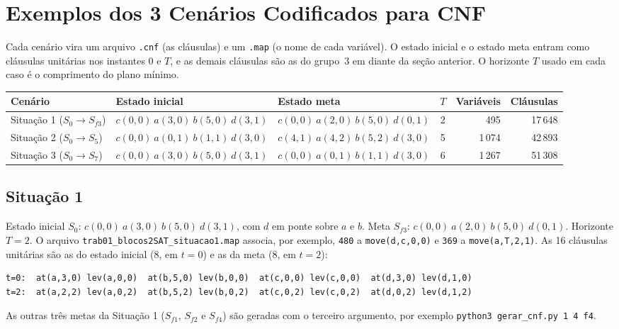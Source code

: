 \section{Exemplos dos 3 Cenários Codificados para CNF}

Cada cenário vira um arquivo \texttt{.cnf} (as cláusulas) e um \texttt{.map} (o nome de cada variável). O estado inicial e o estado meta entram como cláusulas unitárias nos instantes $0$ e $T$, e as demais cláusulas são as do grupo~3 em diante da seção anterior. O horizonte $T$ usado em cada caso é o comprimento do plano mínimo.

\begin{center}
\begin{tabular}{l l l c r r}
\toprule
Cenário & Estado inicial & Estado meta & $T$ & Variáveis & Cláusulas \\
\midrule
Situação 1 ($S_0\to S_{f3}$) & $c(0,0)\ a(3,0)\ b(5,0)\ d(3,1)$ & $c(0,0)\ a(2,0)\ b(5,0)\ d(0,1)$ & 2 & 495 & 17\,648 \\
Situação 2 ($S_0\to S_5$) & $c(0,0)\ a(0,1)\ b(1,1)\ d(3,0)$ & $c(4,1)\ a(4,2)\ b(5,2)\ d(3,0)$ & 5 & 1\,074 & 42\,893 \\
Situação 3 ($S_0\to S_7$) & $c(0,0)\ a(3,0)\ b(5,0)\ d(3,1)$ & $c(0,0)\ a(0,1)\ b(1,1)\ d(3,0)$ & 6 & 1\,267 & 51\,308 \\
\bottomrule
\end{tabular}
\end{center}

\subsection{Situação 1}
Estado inicial $S_0$: $c(0,0)\ a(3,0)\ b(5,0)\ d(3,1)$, com $d$ em ponte sobre $a$ e $b$. Meta $S_{f3}$: $c(0,0)\ a(2,0)\ b(5,0)\ d(0,1)$. Horizonte $T=2$.
O arquivo \texttt{trab01\_blocos2SAT\_situacao1.map} associa, por exemplo, \texttt{480} a \lstinline|move(d,c,0,0)| e \texttt{369} a \lstinline|move(a,T,2,1)|.
As 16 cláusulas unitárias são as do estado inicial (8, em $t=0$) e as da meta (8, em $t=2$):
\begin{lstlisting}
t=0:  at(a,3,0) lev(a,0,0)  at(b,5,0) lev(b,0,0)  at(c,0,0) lev(c,0,0)  at(d,3,0) lev(d,1,0)
t=2:  at(a,2,2) lev(a,0,2)  at(b,5,2) lev(b,0,2)  at(c,0,2) lev(c,0,2)  at(d,0,2) lev(d,1,2)
\end{lstlisting}
As outras três metas da Situação 1 ($S_{f1}$, $S_{f2}$ e $S_{f4}$) são geradas com o terceiro argumento, por exemplo \texttt{python3 gerar\_cnf.py 1 4 f4}.

